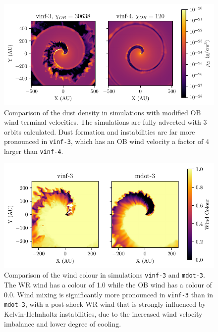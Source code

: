 \documentclass[fleqn,usenatbib]{mnras}
\begin{document}





\begin{figure}
  \centering
  \includegraphics[width=\linewidth]{assets/results/vinf/vinf-rhod.pdf}
  \caption[OB terminal velocity wind dust comparison]{Comparison of the dust density in simulations with modified OB wind terminal velocities. The simulations are fully advected with 3 orbits calculated. Dust formation and instabilities are far more pronounced in \texttt{vinf-3}, which has an OB wind velocity a factor of 4 larger than \texttt{vinf-4}.}
  \label{fig:obvinfzcomp}
\end{figure}

\begin{figure}
  \centering
  \includegraphics[width=\linewidth]{assets/results/mixed/eta-004-comparison-r0.pdf}
  \caption[Wind colour comparison of $\eta = 0.04$ winds]{Comparison of the wind colour in simulations \texttt{vinf-3} and \texttt{mdot-3}. The WR wind has a colour of 1.0 while the OB wind has a colour of 0.0. Wind mixing is significantly more pronounced in \texttt{vinf-3} than in \texttt{mdot-3}, with a post-shock WR wind that is strongly influenced by Kelvin-Helmholtz instabilities, due to the increased wind velocity imbalance and lower degree of cooling.}
  \label{fig:eta004comparisoncolour}
\end{figure}
\end{document}
